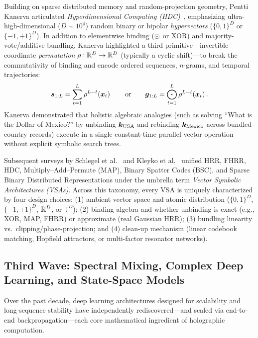Building on sparse distributed memory and random-projection geometry, Pentti Kanerva articulated \emph{Hyperdimensional Computing (HDC)}~\cite{KANERVA_2009_HDC}, emphasizing ultra-high-dimensional ($D \sim 10^4$) random binary or bipolar \emph{hypervectors} ($\{0, 1\}^D$ or $\{-1, +1\}^D$).
In addition to elementwise binding ($\odot$ or XOR) and majority-vote/additive bundling, Kanerva highlighted a third primitive---invertible coordinate \emph{permutation} $\rho: \mathbb{R}^D \to \mathbb{R}^D$ (typically a cyclic shift)---to break the commutativity of binding and encode ordered sequences, $n$-grams, and temporal trajectories:
\begin{equation}\label{eq:hdc_sequence}
    \boldsymbol{s}_{1:L} = \sum_{t=1}^{L} \rho^{L - t}\!\left(\boldsymbol{x}_t\right)
    \qquad\text{or}\qquad
    \boldsymbol{g}_{1:L} = \bigodot_{t=1}^{L} \rho^{L - t}\!\left(\boldsymbol{x}_t\right).
\end{equation}
Kanerva demonstrated that holistic algebraic analogies (such as solving ``What is the Dollar of Mexico?'' by unbinding $\boldsymbol{k}_{\mathrm{USA}}$ and rebinding $\boldsymbol{k}_{\mathrm{Mexico}}$ across bundled country records) execute in a single constant-time parallel vector operation without explicit symbolic search trees.

Subsequent surveys by Schlegel et al.~\cite{SCHLEGEL_VSA_COMPARISON} and Kleyko et al.~\cite{KLEYKO_VSA_SURVEY} unified HRR, FHRR, HDC, Multiply--Add--Permute (MAP), Binary Spatter Codes (BSC), and Sparse Binary Distributed Representations under the umbrella term \emph{Vector Symbolic Architectures (VSAs)}.
Across this taxonomy, every VSA is uniquely characterized by four design choices: (1) ambient vector space and atomic distribution ($\{0,1\}^D$, $\{-1,+1\}^D$, $\mathbb{R}^D$, or $\mathbb{T}^D$); (2) binding algebra and whether unbinding is exact (e.g., XOR, MAP, FHRR) or approximate (real Gaussian HRR); (3) bundling linearity vs.\ clipping/phase-projection; and (4) clean-up mechanism (linear codebook matching, Hopfield attractors, or multi-factor resonator networks).

\subsection{Third Wave: Spectral Mixing, Complex Deep Learning, and State-Space Models}\label{sec:history:modern}

Over the past decade, deep learning architectures designed for scalability and long-sequence stability have independently rediscovered---and scaled via end-to-end backpropagation---each core mathematical ingredient of holographic computation.

